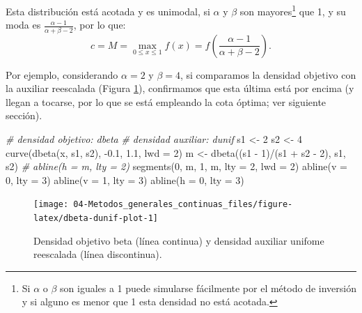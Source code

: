\documentclass[
]{book}
\newenvironment{Shaded}{\begin{snugshade}}{\end{snugshade}}
\newcommand{\AttributeTok}[1]{\textcolor[rgb]{0.77,0.63,0.00}{#1}}
\newcommand{\CommentTok}[1]{\textcolor[rgb]{0.56,0.35,0.01}{\textit{#1}}}
\newcommand{\DecValTok}[1]{\textcolor[rgb]{0.00,0.00,0.81}{#1}}
\newcommand{\FloatTok}[1]{\textcolor[rgb]{0.00,0.00,0.81}{#1}}
\newcommand{\FunctionTok}[1]{\textcolor[rgb]{0.00,0.00,0.00}{#1}}
\newcommand{\NormalTok}[1]{#1}
\newcommand{\OtherTok}[1]{\textcolor[rgb]{0.56,0.35,0.01}{#1}}
\newcommand{\SpecialCharTok}[1]{\textcolor[rgb]{0.00,0.00,0.00}{#1}}
\theoremstyle{break}
\theoremstyle{nonumberplain}
\begin{document}
Esta distribución está acotada y es unimodal, si \(\alpha\) y \(\beta\) son mayores\footnote{Si \(\alpha\) o \(\beta\) son iguales a 1 puede simularse fácilmente por el método de inversión y si alguno es menor que 1 esta densidad no está acotada.} que 1, y su moda es \(\frac{\alpha - 1} {\alpha + \beta - 2}\), por lo que:
\[c = M = \max_{0 \leq x \leq 1}f(x) = f\left( \frac{\alpha - 1} {\alpha + \beta - 2} \right).\]

Por ejemplo, considerando \(\alpha = 2\) y \(\beta = 4\), si comparamos la densidad objetivo con la auxiliar reescalada (Figura \ref{fig:dbeta-dunif-plot}), confirmamos que esta última está por encima (y llegan a tocarse, por lo que se está empleando la cota óptima; ver siguiente sección).

\begin{Shaded}
\begin{Highlighting}[]
\CommentTok{\# densidad objetivo: dbeta}
\CommentTok{\# densidad auxiliar: dunif}
\NormalTok{s1 }\OtherTok{\textless{}{-}} \DecValTok{2}
\NormalTok{s2 }\OtherTok{\textless{}{-}} \DecValTok{4}
\FunctionTok{curve}\NormalTok{(}\FunctionTok{dbeta}\NormalTok{(x, s1, s2), }\SpecialCharTok{{-}}\FloatTok{0.1}\NormalTok{, }\FloatTok{1.1}\NormalTok{, }\AttributeTok{lwd =} \DecValTok{2}\NormalTok{)}
\NormalTok{m }\OtherTok{\textless{}{-}} \FunctionTok{dbeta}\NormalTok{((s1 }\SpecialCharTok{{-}} \DecValTok{1}\NormalTok{)}\SpecialCharTok{/}\NormalTok{(s1 }\SpecialCharTok{+}\NormalTok{ s2 }\SpecialCharTok{{-}} \DecValTok{2}\NormalTok{), s1, s2)}
\CommentTok{\# abline(h = m, lty = 2)}
\FunctionTok{segments}\NormalTok{(}\DecValTok{0}\NormalTok{, m, }\DecValTok{1}\NormalTok{, m, }\AttributeTok{lty =} \DecValTok{2}\NormalTok{, }\AttributeTok{lwd =} \DecValTok{2}\NormalTok{)}
\FunctionTok{abline}\NormalTok{(}\AttributeTok{v =} \DecValTok{0}\NormalTok{, }\AttributeTok{lty =} \DecValTok{3}\NormalTok{)}
\FunctionTok{abline}\NormalTok{(}\AttributeTok{v =} \DecValTok{1}\NormalTok{, }\AttributeTok{lty =} \DecValTok{3}\NormalTok{)}
\FunctionTok{abline}\NormalTok{(}\AttributeTok{h =} \DecValTok{0}\NormalTok{, }\AttributeTok{lty =} \DecValTok{3}\NormalTok{)}
\end{Highlighting}
\end{Shaded}

\begin{figure}[!htb]

{\centering \texttt{[image: 04-Metodos\_generales\_continuas\_files/figure-latex/dbeta-dunif-plot-1]} 

}

\caption{Densidad objetivo beta (línea continua) y densidad auxiliar unifome reescalada (línea discontinua).}\label{fig:dbeta-dunif-plot}
\end{figure}
\end{document}
